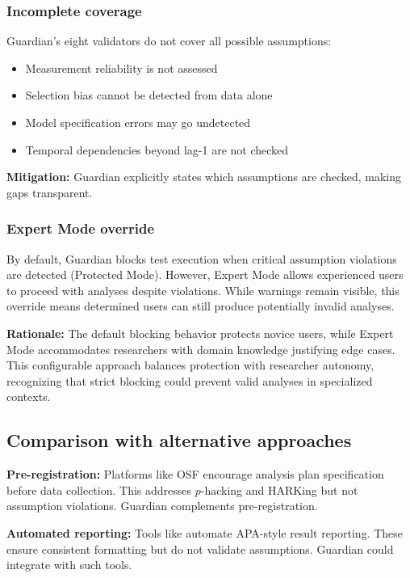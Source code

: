 \documentclass[article]{jss}
\begin{document}
\subsubsection{Incomplete coverage}

Guardian's eight validators do not cover all possible assumptions:
\begin{itemize}
\item Measurement reliability is not assessed
\item Selection bias cannot be detected from data alone
\item Model specification errors may go undetected
\item Temporal dependencies beyond lag-1 are not checked
\end{itemize}

\textbf{Mitigation:} Guardian explicitly states which assumptions are checked, making gaps transparent.

\subsubsection{Expert Mode override}

By default, Guardian blocks test execution when critical assumption violations are detected (Protected Mode). However, Expert Mode allows experienced users to proceed with analyses despite violations. While warnings remain visible, this override means determined users can still produce potentially invalid analyses.

\textbf{Rationale:} The default blocking behavior protects novice users, while Expert Mode accommodates researchers with domain knowledge justifying edge cases. This configurable approach balances protection with researcher autonomy, recognizing that strict blocking could prevent valid analyses in specialized contexts.

\subsection{Comparison with alternative approaches}

\textbf{Pre-registration:} Platforms like OSF encourage analysis plan specification before data collection. This addresses $p$-hacking and HARKing but not assumption violations. Guardian complements pre-registration.

\textbf{Automated reporting:} Tools like  \citep{aust2020papaja} automate APA-style result reporting. These ensure consistent formatting but do not validate assumptions. Guardian could integrate with such tools.
\end{document}
